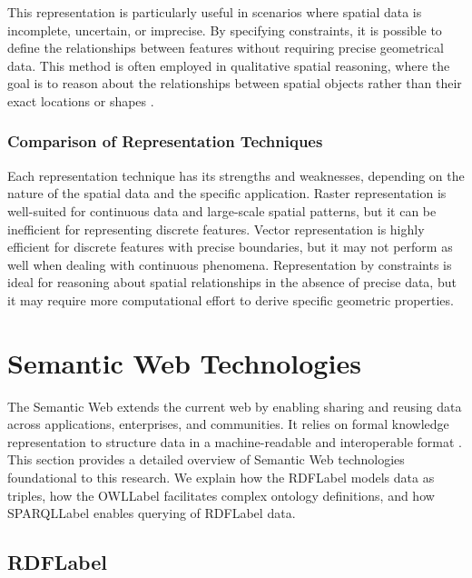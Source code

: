 This representation is particularly useful in scenarios where spatial data is incomplete, uncertain, or imprecise. By specifying constraints, it is possible to define the relationships between features without requiring precise geometrical data. This method is often employed in qualitative spatial reasoning, where the goal is to reason about the relationships between spatial objects rather than their exact locations or shapes \cite{clarkeSituationalCrimePrevention1997}.

\subsubsection{Comparison of Representation Techniques}\label{II-subsubsec:comparisonRepresentation}

Each representation technique has its strengths and weaknesses, depending on the nature of the spatial data and the specific application. Raster representation is well-suited for continuous data and large-scale spatial patterns, but it can be inefficient for representing discrete features. Vector representation is highly efficient for discrete features with precise boundaries, but it may not perform as well when dealing with continuous phenomena. Representation by constraints is ideal for reasoning about spatial relationships in the absence of precise data, but it may require more computational effort to derive specific geometric properties.


\section{Semantic Web Technologies}\label{II-sec:semantic_web_technologies}

The Semantic Web extends the current web by enabling sharing and reusing data across applications, enterprises, and communities. It relies on formal knowledge representation to structure data in a machine-readable and interoperable format \cite{berners-leeSemanticWebNew2001}. This section provides a detailed overview of Semantic Web technologies foundational to this research. We explain how the \acrshort{RDFLabel} models data as triples, how the \acrshort{OWLLabel} facilitates complex ontology definitions, and how \acrshort{SPARQLLabel} enables querying of \acrshort{RDFLabel} data.

\subsection{ \acrfull{RDFLabel}}\label{II-subsec:rdf}

